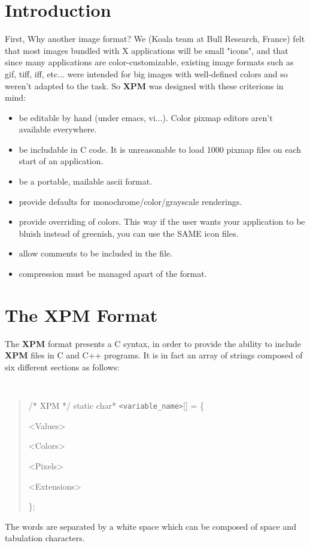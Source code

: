 \newpage
\section{Introduction}
First, Why another image format?  We (Koala team at Bull Research, France)
felt that most images bundled with X applications will be small "icons", and
that since many applications are color-customizable, existing image formats
such as gif, tiff, iff, etc... were intended for big images with well-defined
colors and so weren't adapted to the task.  So {\bf XPM} was designed with
these criterions in mind:
\begin{itemize}
\item be editable by hand (under emacs, vi...). Color pixmap editors aren't
available everywhere.
\item be includable in C code. It is unreasonable to load
1000 pixmap files on each start of an application.
\item be a portable, mailable ascii format.
\item provide defaults for monochrome/color/grayscale renderings.
\item provide overriding of colors. This way if the user wants your application
to be bluish instead of greenish, you can use the SAME icon files.
\item allow comments to be included in the file.
\item compression must be managed apart of the format.
\end{itemize}

\newpage
\section{The {\bf XPM} Format}

The {\bf XPM} format presents a C syntax, in order to provide the ability to
include {\bf XPM} files in C and C++ programs.  It is in fact an array of
strings composed of six different sections as follows:
{\tt
\begin{quote}
/* XPM */
static char* {\tt <variable\_name>}[] = \{

<Values>

<Colors>

<Pixels>

<Extensions>

\};
\end{quote}
}

The words are separated by a white space which can be composed of space and
tabulation characters.  

